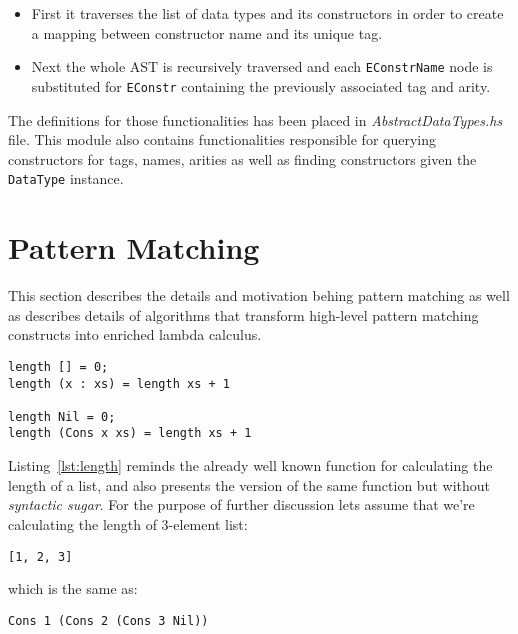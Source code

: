 \documentclass[12pt,a4paper]{report}
\begin{document}
\begin{itemize}
  \item First it traverses the list of data types and its constructors in order
    to create a mapping between constructor name and its unique tag.
  \item Next the whole AST is recursively traversed and each
    \texttt{EConstrName} node is substituted for \texttt{EConstr} containing
    the previously associated tag and arity.
\end{itemize}

The definitions for those functionalities has been placed in
\textit{AbstractDataTypes.hs} file. This module also contains functionalities
responsible for querying constructors for tags, names, arities as well as
finding constructors given the \texttt{DataType} instance.


\section{Pattern Matching}
This section describes the details and motivation behing pattern matching as
well as describes details of algorithms that transform high-level pattern
matching constructs into enriched lambda calculus.

\hspace*{-1.5in}
\begin{lstlisting}[style=haskell,label=lst:length,caption={Calculating length of list.}]
length [] = 0;
length (x : xs) = length xs + 1

length Nil = 0;
length (Cons x xs) = length xs + 1
\end{lstlisting}

Listing~\ref{lst:length} reminds the already well known function for
calculating the length of a list, and also presents the version of the same
function but without \textit{syntactic sugar}. For the purpose of further
discussion lets assume that we're calculating the length of 3-element list:

\hspace*{-1.5in}
\begin{lstlisting}[style=haskell]
[1, 2, 3]
\end{lstlisting}
which is the same as:

\hspace*{-1.5in}
\begin{lstlisting}[style=haskell]
Cons 1 (Cons 2 (Cons 3 Nil))
\end{lstlisting}
\end{document}
